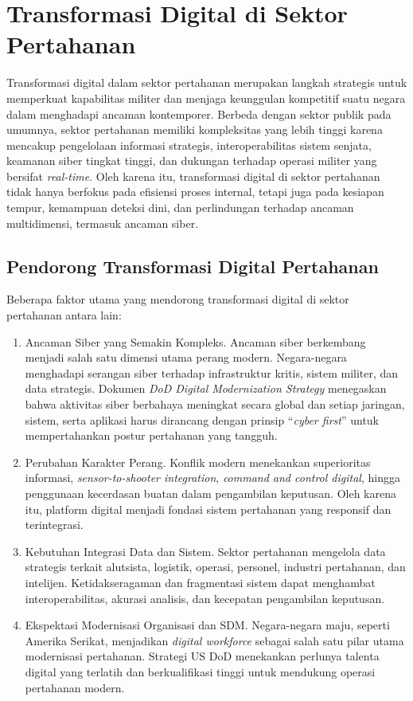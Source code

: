 \section{Transformasi Digital di Sektor Pertahanan}
Transformasi digital dalam sektor pertahanan merupakan langkah strategis untuk memperkuat kapabilitas militer dan menjaga keunggulan kompetitif suatu negara dalam menghadapi ancaman kontemporer.
Berbeda dengan sektor publik pada umumnya, sektor pertahanan memiliki kompleksitas yang lebih tinggi karena mencakup pengelolaan informasi strategis, interoperabilitas sistem senjata, keamanan siber tingkat tinggi, dan dukungan terhadap operasi militer yang bersifat \textit{real-time}.
Oleh karena itu, transformasi digital di sektor pertahanan tidak hanya berfokus pada efisiensi proses internal, tetapi juga pada kesiapan tempur, kemampuan deteksi dini, dan perlindungan terhadap ancaman multidimensi, termasuk ancaman siber.

\subsection{Pendorong Transformasi Digital Pertahanan}
Beberapa faktor utama yang mendorong transformasi digital di sektor pertahanan antara lain:
\begin{enumerate}
  \item Ancaman Siber yang Semakin Kompleks.
  Ancaman siber berkembang menjadi salah satu dimensi utama perang modern.
  Negara-negara menghadapi serangan siber terhadap infrastruktur kritis, sistem militer, dan data strategis.
  Dokumen \textit{DoD Digital Modernization Strategy} \parencite{U.S.DepartmentofDefense2019} menegaskan bahwa aktivitas siber berbahaya meningkat secara global dan setiap jaringan, sistem, serta aplikasi harus dirancang dengan prinsip “\textit{cyber first}” untuk mempertahankan postur pertahanan yang tangguh.
  \item Perubahan Karakter Perang.
  Konflik modern menekankan superioritas informasi, \textit{sensor-to-shooter integration}, \textit{command and control digital}, hingga penggunaan kecerdasan buatan dalam pengambilan keputusan.
  Oleh karena itu, platform digital menjadi fondasi sistem pertahanan yang responsif dan terintegrasi.
  \item Kebutuhan Integrasi Data dan Sistem.
  Sektor pertahanan mengelola data strategis terkait alutsista, logistik, operasi, personel, industri pertahanan, dan intelijen.
  Ketidakseragaman dan fragmentasi sistem dapat menghambat interoperabilitas, akurasi analisis, dan kecepatan pengambilan keputusan.
  \item Ekspektasi Modernisasi Organisasi dan SDM.
  Negara-negara maju, seperti Amerika Serikat, menjadikan \textit{digital workforce} sebagai salah satu pilar utama modernisasi pertahanan.
  Strategi US DoD menekankan perlunya talenta digital yang terlatih dan berkualifikasi tinggi untuk mendukung operasi pertahanan modern.
\end{enumerate}

